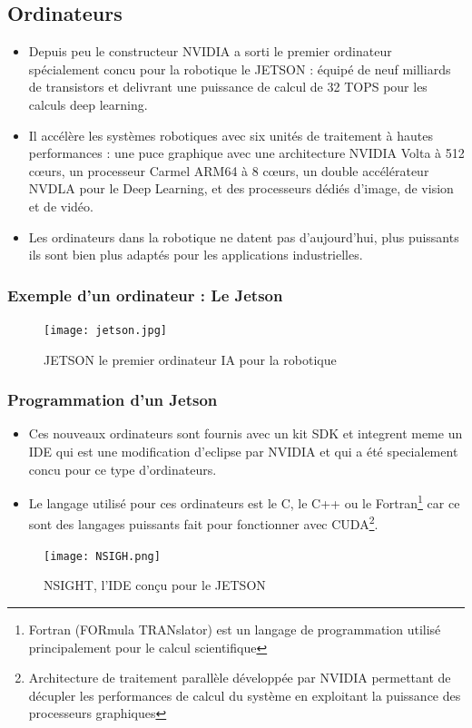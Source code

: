 \documentclass{beamer}
\begin{document}
\subsection{Ordinateurs}
\begin{frame}
\begin{itemize}
\frametitle{Définition}
\item Depuis peu le constructeur NVIDIA a sorti le premier ordinateur spécialement concu pour la robotique le JETSON : équipé de neuf milliards de transistors et delivrant une puissance de calcul de 32 TOPS pour les calculs deep learning.
\item Il accélère les systèmes robotiques avec six unités de traitement à hautes performances : une puce graphique avec une architecture NVIDIA Volta à 512 cœurs, un processeur Carmel ARM64 à 8 cœurs, un double accélérateur NVDLA pour le Deep Learning, et des processeurs dédiés d’image, de vision et de vidéo.
\item Les ordinateurs dans la robotique ne datent pas d'aujourd'hui, plus puissants ils sont bien plus adaptés pour les applications industrielles.
\end{itemize}
\end{frame}
\begin{frame}
\frametitle{Exemple d'un ordinateur : Le Jetson}
\begin{figure}[!h]
\centering
\texttt{[image: jetson.jpg]}
\caption{JETSON le premier ordinateur IA pour la robotique}
\end{figure}
\end{frame}
\begin{frame}
\frametitle{Programmation d'un Jetson}
\begin{itemize}
\item Ces nouveaux ordinateurs sont fournis avec un kit SDK  et integrent meme un IDE qui est une modification d'eclipse par NVIDIA et qui a été specialement concu pour ce type d'ordinateurs.
\item Le langage utilisé pour ces ordinateurs est le C, le C++  ou le Fortran\footnote{Fortran (FORmula TRANslator) est un langage de programmation utilisé principalement pour le calcul scientifique} car ce sont des langages puissants fait pour fonctionner avec CUDA\footnote{Architecture de traitement parallèle développée par NVIDIA permettant de décupler les performances de calcul du système en exploitant la puissance des processeurs graphiques }.
\end{itemize}
\end{frame}
\begin{frame}
\begin{figure}[!h]
\centering
\texttt{[image: NSIGH.png]}
\caption{NSIGHT, l'IDE conçu pour le JETSON}
\end{figure}
\end{frame}
\end{document}
